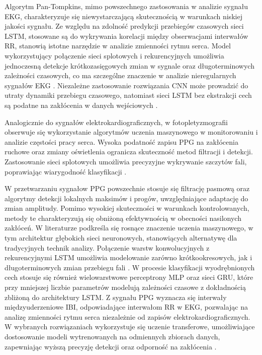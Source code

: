 \documentclass[journal]{IEEEtran}
\begin{document}
Algorytm Pan-Tompkins, mimo powszechnego zastosowania w analizie sygnału EKG, charakteryzuje się niewystarczającą skutecznością w warunkach niskiej jakości sygnału. Ze względu na zdolność predykcji przebiegów czasowych sieci LSTM, stosowane są do wykrywania korelacji między obserwacjami interwałów RR, stanowią istotne narzędzie w analizie zmienności rytmu serca.
Model wykorzystujący połączenie sieci splotowych i rekurencyjnych umożliwia jednoczesną detekcje krótkozasięgowych zmian w sygnale oraz długoterminowych zależności czasowych, co ma szczególne znaczenie w analizie nieregularnych sygnałów EKG \cite{2}. Niezależne zastosowanie rozwiązania CNN może prowadzić do utraty dynamiki przebiegu czasowego, natomiast sieci LSTM bez ekstrakcji cech są podatne na zakłócenia w danych wejściowych \cite{3}.

\newpage
Analogicznie do sygnałów elektrokardiograficznych, w fotopletyzmografii obserwuje się wykorzystanie algorytmów uczenia maszynowego w monitorowaniu i analizie częstości pracy serca. Wysoka podatność zapisu PPG na zakłócenia ruchowe oraz zmiany oświetlenia ogranicza skuteczność metod filtracji i detekcji. Zastosowanie sieci splotowych umożliwia precyzyjne wykrywanie szczytów fali, poprawiając wiarygodność klasyfikacji \cite{4}.

W przetwarzaniu sygnałow PPG powszechnie stosuje się filtrację pasmową oraz algorytmy detekcji lokalnych maksimów i progów, uwzględniające adaptację do zmian amplitudy. Pomimo wysokiej skuteczności w warunkach kontrolowanych, metody te charakteryzują się obniżoną efektywnością w obecności nasilonych zakłóceń. W literaturze podkreśla się rosnące znaczenie  uczenia maszynowego, w tym architektur głębokich sieci neuronowych, stanowiących  alternatywę dla tradycyjnych technik analizy. Połączenie warstw konwolucyjnych z rekurencyjnymi LSTM umożliwia modelowanie zarówno krótkookresowych, jak i długoterminowych zmian przebiegu fali \cite{5}. W procesie klasyfikacji wyodrębnionych cech stosuje się również wielowarstwowe perceptrony MLP oraz sieci GRU, które przy mniejszej liczbie parametrów modelują zależności czasowe z dokładnością zbliżoną do architektury LSTM.
Z sygnału PPG wyznacza się interwały międzyuderzeniowe IBI, odpowiadające interwałom RR w EKG, pozwalając na analizę zmienności rytmu serca niezależnie od zapisów elektrokardiograficznych. W wybranych rozwiązaniach wykorzystuje się uczenie transferowe, umożliwiające dostosowanie modeli wytrenowanych na odmiennych zbiorach danych, zapewniając wyższą precyzję detekcji oraz odporność na zakłócenia \cite{6}.
\end{document}
